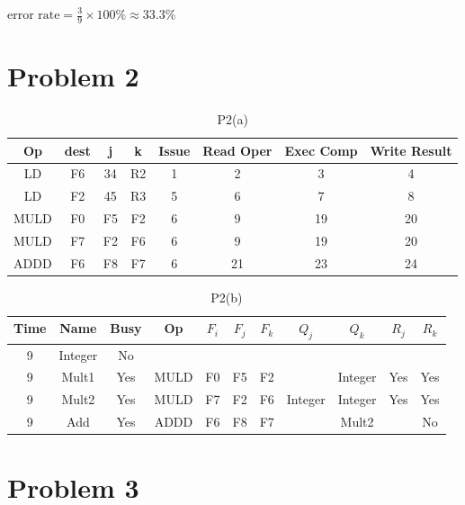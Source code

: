 \documentclass{article}
\begin{document}
$\text{error rate}=\frac{3}{9} \times 100\% \approx 33.3\%$


\section{Problem 2}

\begin{table}[h!]
\centering
\begin{tabular}{|c|c|c|c|c|c|c|c|}
\hline
Op & dest & j & k & Issue & Read Oper & Exec Comp & Write Result \\
\hline
    LD & F6 & 34 & R2 & 1 & 2 & 3 & 4 \\
    LD & F2 & 45 & R3 & 5 & 6 & 7 & 8 \\
    MULD & F0 & F5 & F2 & 6 & 9 & 19 & 20 \\
    MULD & F7 & F2 & F6 & 6 & 9 & 19 & 20 \\
    ADDD & F6 & F8 & F7 & 6 & 21 & 23 & 24 \\
\hline
\end{tabular}
\caption{P2(a)}
\end{table}

\begin{table}[h!]
\centering
\begin{tabular}{|c|c|c|c|c|c|c|c|c|c|c|}
\hline
Time & Name & Busy & Op & \(F_i\) & \(F_j\) & \(F_k\) & \(Q_j\) & \(Q_k\) & \(R_j\) & \(R_k\) \\
\hline
    9 & Integer & No & & & & & & & &\\
    9 & Mult1 & Yes & MULD & F0 & F5 & F2 & & Integer & Yes & Yes \\
    9 & Mult2 & Yes & MULD & F7 & F2 & F6 & Integer & Integer & Yes & Yes \\
    9 & Add & Yes & ADDD & F6 & F8 & F7 & & Mult2 & & No \\
\hline
\end{tabular}
\caption{P2(b)}
\end{table}

\section{Problem 3}
\end{document}
